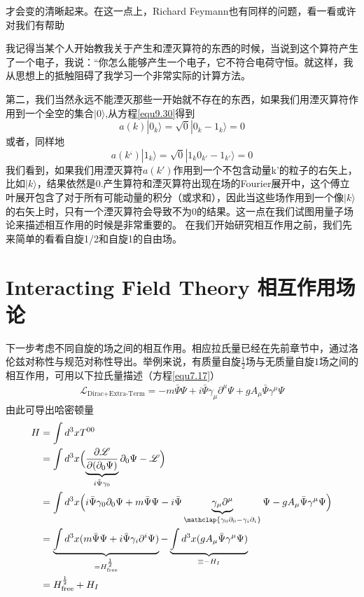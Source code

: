 才会变的清晰起来。在这一点上，Richard Feymann也有同样的问题，看一看或许对我们有帮助\\
\begin{center}
\parbox{0.9\textwidth}{\small 我记得当某个人开始教我关于产生和湮灭算符的东西的时候，当说到这个算符产生了一个电子，我说：“你怎么能够产生一个电子，它不符合电荷守恒。就这样，我从思想上的抵触阻碍了我学习一个非常实际的计算方法。}
\end{center}\vspace{4mm}
第二，我们当然永远不能湮灭那些一开始就不存在的东西，如果我们用湮灭算符作用到一个全空的集合$|0\rangle$,从方程\ref{equ9.30}得到
\begin{equation}
\label{equ9.31}
a(k)|0_{k} \rangle=\sqrt{0}|0_{k}-1_{k} \rangle=0
\end{equation}
或者，同样地
\begin{equation}
\label{equ9.32}
a(k‘)|1_{k} \rangle=\sqrt{0}|1_{k}0_{k'}-1_{k'} \rangle=0
\end{equation}
我们看到，如果我们用湮灭算符$a(k')$作用到一个不包含动量k'的粒子的右矢上，比如$|k\rangle$，结果依然是0.产生算符和湮灭算符出现在场的Fourier展开中，这个傅立叶展开包含了对于所有可能动量的积分（或求和），因此当这些场作用到一个像$|k\rangle$的右矢上时，只有一个湮灭算符会导致不为0的结果。这一点在我们试图用量子场论来描述相互作用的时候是非常重要的。
在我们开始研究相互作用之前，我们先来简单的看看自旋1/2和自旋1的自由场。


\section{Interacting Field Theory 相互作用场论}\label{sec9.5}
下一步考虑不同自旋的场之间的相互作用。相应拉氏量已经在先前章节中，通过洛伦兹对称性与规范对称性导出。举例来说，有质量自旋$\frac{1}{2}$场与无质量自旋$1$场之间的相互作用，可用以下拉氏量描述（方程\ref{equ7.17}）
\begin{align}\label{equ9.45}
\mathscr{L}_\text{Dirac+Extra-Term}=-m\bar{\Psi}\Psi+i\bar{\Psi}\gamma_\mu\partial^\mu\Psi+gA_\mu\bar{\Psi}\gamma^\mu\Psi
\end{align}
由此可导出哈密顿量
\begin{align}\label{equ9.46}
H&=\int{d^3x T^{00}}\nonumber\\
&=\int{d^3x\Bigl(\underbrace{\frac{\partial\mathscr{L}}{\partial(\partial_0\Psi)} }_{i\bar{\Psi}\gamma_0}\partial_0\Psi-\mathscr{L} \Bigl)}\nonumber\\
&=\int d^3x\Bigl( i\bar{\Psi}\gamma_0\partial_0\Psi+m\bar{\Psi}\Psi-i\bar{\Psi}\underbrace{\gamma_\mu\partial^\mu}_{\mathclap{\gamma_0\partial_0-\gamma_i\partial_i}}\Psi-gA_\mu\bar{\Psi}\gamma^\mu\Psi \Bigl)\nonumber\\
&=\underbrace{\int d^3x( m\bar{\Psi}\Psi+i\bar{\Psi}\gamma_i\partial^i\Psi)}_{=H^{\frac{1}{2}}_\text{free}}- \underbrace{\int d^3x (gA_\mu\bar{\Psi}\gamma^\mu\Psi )}_{\equiv-H_I}\nonumber\\
&=H_\text{free}^{\frac{1}{2}}+H_I
\end{align}

